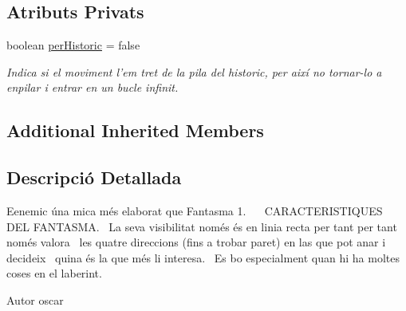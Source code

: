\subsection*{Atributs Privats}
\begin{DoxyCompactItemize}
\item 
\hypertarget{classlogica_1_1_fantasma2_a0f90b4ae2868d1cc3ca055d12014537f}{boolean \hyperlink{classlogica_1_1_fantasma2_a0f90b4ae2868d1cc3ca055d12014537f}{per\+Historic} = false}\label{classlogica_1_1_fantasma2_a0f90b4ae2868d1cc3ca055d12014537f}

\begin{DoxyCompactList}\small\item\em Indica si el moviment l'em tret de la pila del historic, per així no tornar-\/lo a enpilar i entrar en un bucle infinit. \end{DoxyCompactList}\end{DoxyCompactItemize}
\subsection*{Additional Inherited Members}


\subsection{Descripció Detallada}
Eenemic úna mica més elaborat que Fantasma 1.~\newline
~\newline
C\+A\+R\+A\+C\+T\+E\+R\+I\+S\+T\+I\+Q\+U\+E\+S D\+E\+L F\+A\+N\+T\+A\+S\+M\+A.~\newline
La seva visibilitat només és en linia recta per tant per tant només valora~\newline
les quatre direccions (fins a trobar paret) en las que pot anar i decideix~\newline
quina és la que més li interesa.~\newline
Es bo especialment quan hi ha moltes coses en el laberint. 

\begin{DoxyAuthor}{Autor}
oscar 
\end{DoxyAuthor}


